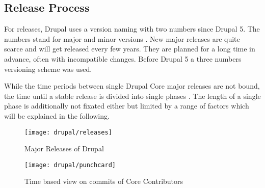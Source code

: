 
\subsection{Release Process} %

For releases, Drupal uses a version naming with two numbers since Drupal 5. The
numbers stand for major and minor versions \cite{DrupalUpgrade}. New major
releases are quite scarce and will get released every few years. They are
planned for a long time in advance, often with incompatible changes. Before
Drupal 5 a three numbers versioning scheme was used.

While the time periods between single Drupal Core major releases are not bound,
the time until a stable release is divided into single phases
\cite{DrupalReleaseCycle}. The length of a single phase is additionally not
fixated either but limited by a range of factors which will be explained in the
following.

\begin{figure}[htbp]
  \centering
  \texttt{[image: drupal/releases]}
  \caption{Major Releases of Drupal}
\end{figure}

\begin{figure}[htbp]
  \centering
  \texttt{[image: drupal/punchcard]}
  \caption{Time based view on commits of Core Contributors}
\end{figure}

